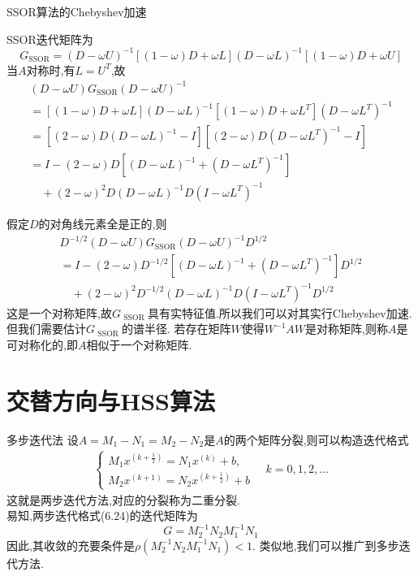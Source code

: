 \documentclass[notheorems,serif]{beamer}
\renewcommand{\normalsize}{\wuhao}
\newcommand{\wuhao}{\fontsize{10.5pt}{\baselineskip}\selectfont}
\begin{document}
\begin{frame}


{\color{blue}\Large SSOR算法的Chebyshev加速}

\quad

\normalsize
SSOR迭代矩阵为
$$
G_{\mathrm{SSOR}}=(D-\omega U)^{-1}[(1-\omega) D+\omega L](D-\omega L)^{-1}[(1-\omega) D+\omega U]
$$
当$A$对称时,有$L=U^{T}$,故
$$
\begin{array}{l}{(D-\omega U) G_{\mathrm{SSOR}}(D-\omega U)^{-1}} \\ {=[(1-\omega) D+\omega L](D-\omega L)^{-1}\left[(1-\omega) D+\omega L^{T}\right]\left(D-\omega L^{T}\right)^{-1}} \\ {=\left[(2-\omega) D(D-\omega L)^{-1}-I\right]\left[(2-\omega) D\left(D-\omega L^{T}\right)^{-1}-I\right]} \\ {=I-(2-\omega) D\left[(D-\omega L)^{-1}+\left(D-\omega L^{T}\right)^{-1}\right]} \\ {\quad+(2-\omega)^{2} D(D-\omega L)^{-1} D\left(I-\omega L^{T}\right)^{-1}}\end{array}
$$
\end{frame}

\begin{frame}
假定$D$的对角线元素全是正的,则
$$
\begin{array}{l}{D^{-1 / 2}(D-\omega U) G_{\mathrm{SSOR}}(D-\omega U)^{-1} D^{1 / 2}} \\ {=I-(2-\omega) D^{-1 / 2}\left[(D-\omega L)^{-1}+\left(D-\omega L^{T}\right)^{-1}\right] D^{1 / 2}} \\ {\quad+(2-\omega)^{2} D^{-1 / 2}(D-\omega L)^{-1} D\left(I-\omega L^{T}\right)^{-1} D^{1 / 2}}\end{array}
$$
这是一个对称矩阵,故$G_{\text { SSOR }}$具有实特征值.所以我们可以对其实行Chebyshev加速.但我们需要估计$G_{\text { SSOR }}$的谱半径.
若存在矩阵$W$使得$W^{-1} A W$是对称矩阵,则称$A$是可对称化的,即$A$相似于一个对称矩阵.\\
\end{frame}

\section{交替方向与HSS算法}
\begin{frame}
{多步迭代法}
设$A=M_{1}-N_{1}=M_{2}-N_{2}$是$A$的两个矩阵分裂,则可以构造迭代格式
\begin{align*}
\left\{\begin{array}{l}{M_{1} x^{\left(k+\frac{1}{2}\right)}=N_{1} x^{(k)}+b,} \\ {M_{2} x^{(k+1)}=N_{2} x^{\left(k+\frac{1}{2}\right)}+b}\end{array} \quad k=0,1,2, \ldots\right.
\tag{6.24}
\end{align*}
这就是两步迭代方法,对应的分裂称为二重分裂.\\
易知,两步迭代格式(6.24)的迭代矩阵为
$$
G=M_{2}^{-1} N_{2} M_{1}^{-1} N_{1}
$$
因此,其收敛的充要条件是$\rho\left(M_{2}^{-1} N_{2} M_{1}^{-1} N_{1}\right)<1$.
类似地,我们可以推广到多步迭代方法.
\end{frame}
\end{document}

